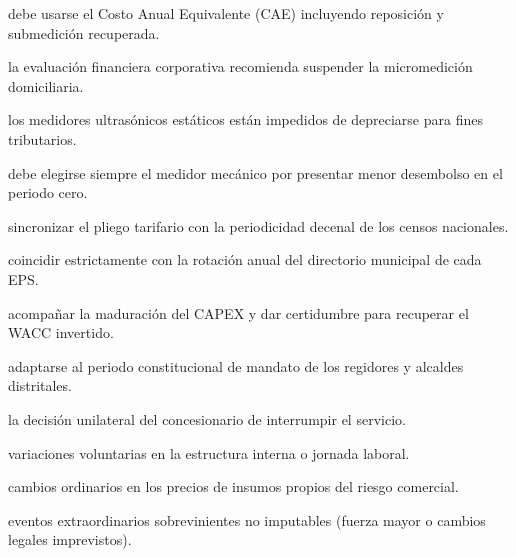 \begin{opts}
    \item debe usarse el Costo Anual Equivalente (CAE) incluyendo reposición y submedición recuperada.
    \item la evaluación financiera corporativa recomienda suspender la micromedición domiciliaria.
    \item los medidores ultrasónicos estáticos están impedidos de depreciarse para fines tributarios.
    \item debe elegirse siempre el medidor mecánico por presentar menor desembolso en el periodo cero.
\end{opts}

\begin{opts}
    \item sincronizar el pliego tarifario con la periodicidad decenal de los censos nacionales.
    \item coincidir estrictamente con la rotación anual del directorio municipal de cada EPS.
    \item acompañar la maduración del CAPEX y dar certidumbre para recuperar el WACC invertido.
    \item adaptarse al periodo constitucional de mandato de los regidores y alcaldes distritales.
\end{opts}

\begin{opts}
    \item la decisión unilateral del concesionario de interrumpir el servicio.
    \item variaciones voluntarias en la estructura interna o jornada laboral.
    \item cambios ordinarios en los precios de insumos propios del riesgo comercial.
    \item eventos extraordinarios sobrevinientes no imputables (fuerza mayor o cambios legales imprevistos).
\end{opts}

